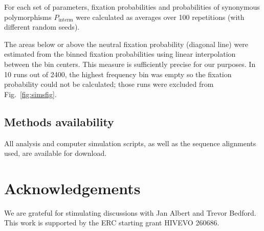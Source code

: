 \documentclass[rmp, twocolumn]{revtex4}
\newcommand{\FIG}[1]{Fig.~\ref{fig:#1}}
\begin{document}
For each set of parameters, fixation probabilities and probabilities of
synonymous polymorphisms $P_\text{interm}$ were calculated as averages over
100 repetitions (with different random seeds).

The areas below or above the neutral fixation probability (diagonal line) were
estimated from the binned fixation probabilities using linear interpolation
between the bin centers. This measure is sufficiently precise for our purposes.
In 10 runs out of 2400, the highest frequency bin was empty so the fixation
probability could not be calculated; those runs were excluded from
\FIG{simsfig}.

\subsection{Methods availability}
All analysis and computer simulation scripts, as well as the sequence alignments
used, are available for download.

\section*{Acknowledgements}
We are grateful for stimulating discussions with Jan Albert and Trevor Bedford.
This work is supported by the ERC starting grant HIVEVO 260686.



\end{document}

